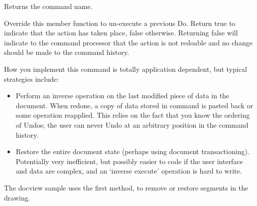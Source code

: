 \label{wxcommandgetname}


Returns the command name.

\label{wxcommandundo}


Override this member function to un-execute a previous Do.
Return true to indicate that the action has taken place, false otherwise.
Returning false will indicate to the command processor that the action is
not redoable and no change should be made to the command history.

How you implement this command is totally application dependent, but typical
strategies include:

\begin{itemize}\itemsep=0pt
\item Perform an inverse operation on the last modified piece of
data in the document. When redone, a copy of data stored in command
is pasted back or some operation reapplied. This relies on the fact that
you know the ordering of Undos; the user can never Undo at an arbitrary position
in the command history.
\item Restore the entire document state (perhaps using document transactioning).
Potentially very inefficient, but possibly easier to code if the user interface
and data are complex, and an `inverse execute' operation is hard to write.
\end{itemize}

The docview sample uses the first method, to remove or restore segments
in the drawing.


